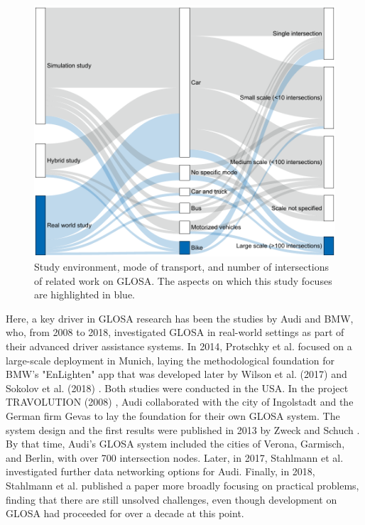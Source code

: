 \begin{figure}
\centering
\includegraphics[width=\linewidth]{images/related-work-sankey.pdf}
\caption{Study environment, mode of transport, and number of intersections of related work on GLOSA. The aspects on which this study focuses are highlighted in blue.}
\label{fig:related-work-piechart}
\end{figure}

\nocite{zhao_green_2023, coppola_integrated_2022, seredynski_complementing_2014, seredynski_improving_2014, radivojevic_impact_2016} %

Here, a key driver in GLOSA research has been the studies by Audi and BMW, who, from 2008 to 2018, investigated GLOSA in real-world settings as part of their advanced driver assistance systems. In 2014, Protschky et al. \cite{protschky_extensive_2014, protschky_adaptive_2014} focused on a large-scale deployment in Munich, laying the methodological foundation for BMW's "EnLighten" app that was developed later by Wilson et al. (2017) \cite{wilson_driver_2017} and Sokolov et al. (2018) \cite{sokolov_effects_2018}. Both studies were conducted in the USA. In the project TRAVOLUTION (2008) \cite{braun_travolution-netzweite_2009}, Audi collaborated with the city of Ingolstadt and the German firm Gevas to lay the foundation for their own GLOSA system. The system design and the first results were published in 2013 by Zweck and Schuch \cite{zweck_traffic_2013}. By that time, Audi's GLOSA system included the cities of Verona, Garmisch, and Berlin, with over 700 intersection nodes. Later, in 2017, Stahlmann et al. \cite{stahlmann_multi-hop_2017} investigated further data networking options for Audi. Finally, in 2018, Stahlmann et al. \cite{stahlmann_exploring_2018} published a paper more broadly focusing on practical problems, finding that there are still unsolved challenges, even though development on GLOSA had proceeded for over a decade at this point.

